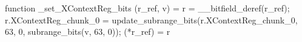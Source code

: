 function _set_XContextReg_bits (r_ref, v) = {
    r = __bitfield_deref(r_ref);
    r.XContextReg_chunk_0 = update_subrange_bits(r.XContextReg_chunk_0, 63, 0, subrange_bits(v, 63, 0));
    (*r_ref) = r
}

